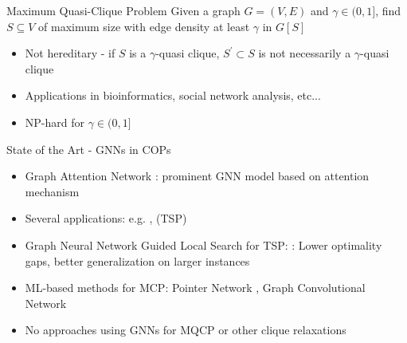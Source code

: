 \documentclass{beamer}
\begin{document}
\begin{frame}{Maximum Quasi-Clique Problem}
    Given a graph $G = (V,E)$ and $\gamma \in (0,1]$, find $S \subseteq V$ of maximum size with edge density at least $\gamma$ in $G[S]$
    \begin{itemize}
        \item<1-> Not hereditary - if $S$ is a $\gamma$-quasi clique, $S^\prime \subset S$ is not necessarily a $\gamma$-quasi clique
        \item<2-> Applications in bioinformatics, social network analysis, etc...
        \item<3-> NP-hard for $\gamma \in (0,1]$ \cite{pattillo_maximum_2013}
    \end{itemize}
\end{frame}


\begin{frame}{State of the Art - GNNs in COPs}
    \begin{itemize}
        \item<1-> Graph Attention Network \cite{Velickovic2018}: prominent GNN model based on attention mechanism \cite{Bahdanau2015}
        \item<2-> Several applications: e.g. \cite{Kool2019}, \cite{Joshi2021} (TSP)
        \item<3-> Graph Neural Network Guided Local Search for TSP: \cite{Hudson2021}: Lower optimality gaps, better generalization on larger instances
        \item<4-> ML-based methods for MCP: Pointer Network \cite{Gu2020}, Graph Convolutional Network \cite{Li2018}
        \item<5-> No approaches using GNNs for MQCP or other clique relaxations
    \end{itemize}
\end{frame}
\end{document}

